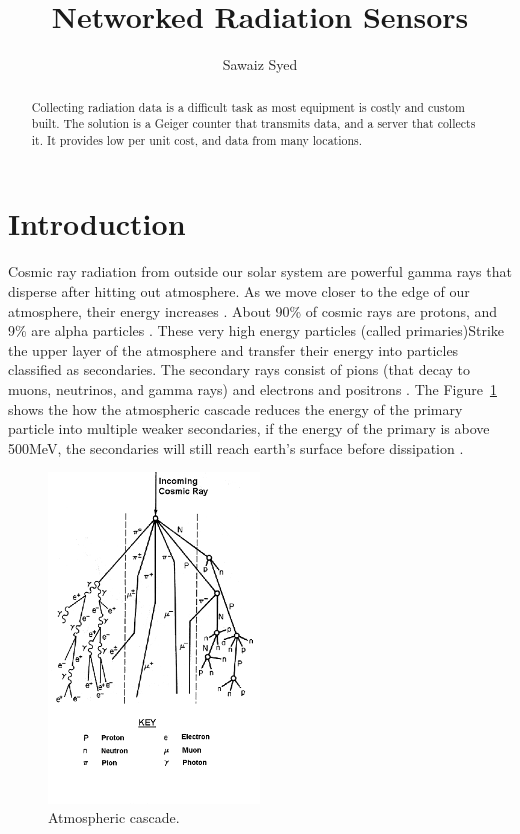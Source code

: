\documentclass[10pt]{article}
\author{Sawaiz Syed}
\title{Networked Radiation Sensors}
\begin{document}
\maketitle

\begin{abstract}
Collecting radiation data is a difficult task as most equipment is costly and custom built. The solution is a Geiger counter that transmits data, and a server that collects it. It provides low per unit cost, and data from many locations.
\end{abstract}

\section{Introduction}
Cosmic ray radiation from outside our solar system are powerful gamma rays that disperse 
after hitting out atmosphere. As we move closer to the edge of our atmosphere, their 
energy increases \cite{Nave}. About 90\% of cosmic rays are protons, and 9\% 
are alpha particles \cite{Nave}. These very high energy particles (called 
primaries)Strike the upper layer of the atmosphere and transfer their energy into 
particles classified as secondaries. The secondary rays consist of pions (that decay 
to muons, neutrinos, and gamma rays) and electrons and positrons \cite{Mewaldt1996}. The 
Figure~\ref{fig:atmosphericCascade} shows the how the atmospheric cascade reduces the energy of 
the primary particle into multiple weaker secondaries, if the energy of the primary 
is above 500MeV, the secondaries will still reach earth's surface before dissipation 
\cite{Bieber2000}. 

\begin{figure}[h]
	\centering
	\includegraphics[width=0.5\textwidth]{atmosphericCascade.png}
	\caption{Atmospheric cascade.}
	\label{fig:atmosphericCascade}
\end{figure}
\end{document}
